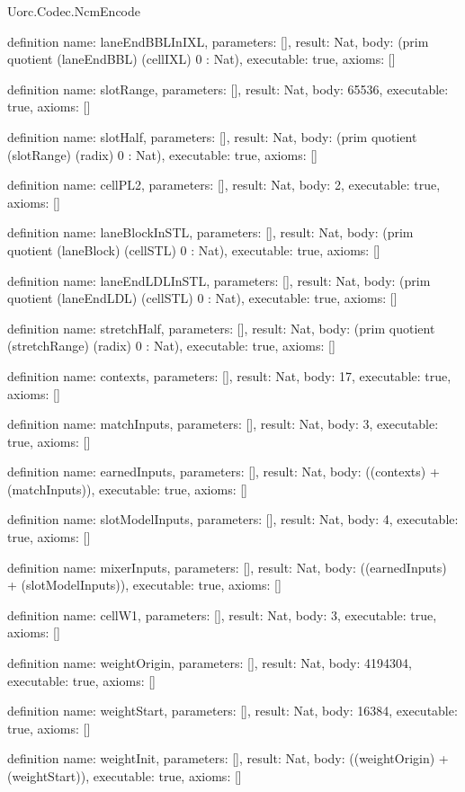 \begin{lexlean}{Uorc.Codec.NcmEncode}
\begin{semanticmodule}
definition{
  name: laneEndBBLInIXL,
  parameters: [],
  result: Nat,
  body: (prim quotient (laneEndBBL) (cellIXL) 0 : Nat),
  executable: true,
  axioms: []
}

definition{
  name: slotRange,
  parameters: [],
  result: Nat,
  body: 65536,
  executable: true,
  axioms: []
}

definition{
  name: slotHalf,
  parameters: [],
  result: Nat,
  body: (prim quotient (slotRange) (radix) 0 : Nat),
  executable: true,
  axioms: []
}

definition{
  name: cellPL2,
  parameters: [],
  result: Nat,
  body: 2,
  executable: true,
  axioms: []
}

definition{
  name: laneBlockInSTL,
  parameters: [],
  result: Nat,
  body: (prim quotient (laneBlock) (cellSTL) 0 : Nat),
  executable: true,
  axioms: []
}

definition{
  name: laneEndLDLInSTL,
  parameters: [],
  result: Nat,
  body: (prim quotient (laneEndLDL) (cellSTL) 0 : Nat),
  executable: true,
  axioms: []
}

definition{
  name: stretchHalf,
  parameters: [],
  result: Nat,
  body: (prim quotient (stretchRange) (radix) 0 : Nat),
  executable: true,
  axioms: []
}

definition{
  name: contexts,
  parameters: [],
  result: Nat,
  body: 17,
  executable: true,
  axioms: []
}

definition{
  name: matchInputs,
  parameters: [],
  result: Nat,
  body: 3,
  executable: true,
  axioms: []
}

definition{
  name: earnedInputs,
  parameters: [],
  result: Nat,
  body: ((contexts) + (matchInputs)),
  executable: true,
  axioms: []
}

definition{
  name: slotModelInputs,
  parameters: [],
  result: Nat,
  body: 4,
  executable: true,
  axioms: []
}

definition{
  name: mixerInputs,
  parameters: [],
  result: Nat,
  body: ((earnedInputs) + (slotModelInputs)),
  executable: true,
  axioms: []
}

definition{
  name: cellW1,
  parameters: [],
  result: Nat,
  body: 3,
  executable: true,
  axioms: []
}

definition{
  name: weightOrigin,
  parameters: [],
  result: Nat,
  body: 4194304,
  executable: true,
  axioms: []
}

definition{
  name: weightStart,
  parameters: [],
  result: Nat,
  body: 16384,
  executable: true,
  axioms: []
}

definition{
  name: weightInit,
  parameters: [],
  result: Nat,
  body: ((weightOrigin) + (weightStart)),
  executable: true,
  axioms: []
}


\end{semanticmodule}
\end{lexlean}
